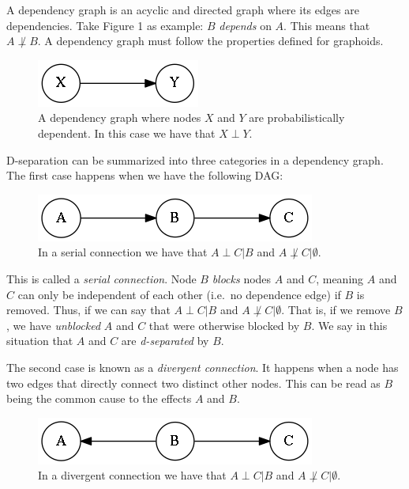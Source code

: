 \documentclass{amsart}
\theoremstyle{plain}
\begin{document}
A dependency graph is an acyclic and directed graph where its edges are dependencies. Take Figure 1
as example: $B$ \textit{depends} on $A$. This means that $A\not\perp B$. A dependency graph must
follow the properties defined for graphoids.

\begin{figure}[h]
  \captionsetup{justification=centering}
  \centering\includegraphics[scale=0.3]{graphs/dep.png}
  \caption{A dependency graph where nodes $X$ and $Y$ are probabilistically dependent. In this case
  we have that $X\perp Y$.}
\end{figure}

D-separation can be summarized into three categories in a dependency graph. The first case happens
when we have the following DAG\@:

\begin{figure}[h]
  \captionsetup{justification=centering}
  \centering\includegraphics[scale=0.3]{graphs/serial.png}
  \caption{In a serial connection we have that $A\perp C|B$ and $A\not\perp C|\emptyset$.}
\end{figure}

This is called a \textit{serial connection}. Node $B$ \textit{blocks} nodes $A$ and $C$, meaning
$A$ and $C$ can only be independent of each other (i.e.\ no dependence edge) if $B$ is removed.
Thus, if we can say that $A\perp C|B$ and $A\not\perp C|\emptyset$. That is, if we remove $B$, we
have \textit{unblocked} $A$ and $C$ that were otherwise blocked by $B$. We say in this situation
that $A$ and $C$ are \textit{d-separated} by $B$.

The second case is known as a \textit{divergent connection}. It happens when a node has two edges
that directly connect two distinct other nodes. This can be read as $B$ being the common cause to
the effects $A$ and $B$.

\begin{figure}[h]
  \captionsetup{justification=centering}
  \centering\includegraphics[scale=0.3]{graphs/divergent.png}
  \caption{In a divergent connection we have that $A\perp C|B$ and $A\not\perp C|\emptyset$.}
\end{figure}
\end{document}
